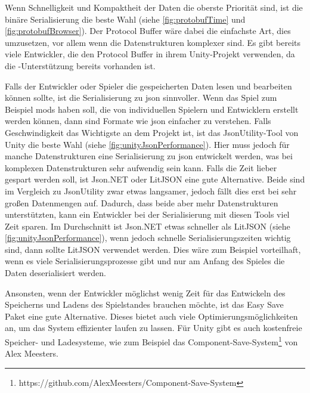 Wenn Schnelligkeit und Kompaktheit der Daten die oberste Priorität sind, ist die binäre Serialisierung die beste Wahl (siehe \ref{fig:protobufTime} und \ref{fig:protobufBrowser}). Der Protocol Buffer wäre dabei die einfachste Art, dies umzusetzen, vor allem wenn die Datenstrukturen komplexer sind. Es gibt bereits viele Entwickler, die den Protocol Buffer in ihrem Unity-Projekt verwenden, da die \csharp{}-Unterstützung bereits vorhanden ist. 

Falls der Entwickler oder Spieler die gespeicherten Daten lesen und bearbeiten können sollte, ist die Serialisierung zu \ac{json} sinnvoller. Wenn das Spiel zum Beispiel \acp{mod} haben soll, die von individuellen Spielern und Entwicklern erstellt werden können, dann sind Formate wie \ac{json} einfacher zu verstehen. Falls Geschwindigkeit das Wichtigste an dem Projekt ist, ist das JsonUtility-Tool von Unity die beste Wahl (siehe \ref{fig:unityJsonPerformance}). Hier muss jedoch für manche Datenstrukturen eine Serialisierung zu \ac{json} entwickelt werden, was bei komplexen Datenstrukturen sehr aufwendig sein kann. Falls die Zeit lieber gespart werden soll, ist Json.NET oder LitJSON eine gute Alternative. Beide sind im Vergleich zu JsonUtility zwar etwas langsamer, jedoch fällt dies erst bei sehr großen Datenmengen auf. Dadurch, dass beide aber mehr Datenstrukturen unterstützten, kann ein Entwickler bei der Serialisierung mit diesen Tools viel Zeit sparen. Im Durchschnitt ist Json.NET etwas schneller als LitJSON (siehe \ref{fig:unityJsonPerformance}), wenn jedoch schnelle Serialisierungszeiten wichtig sind, dann sollte LitJSON verwendet werden. Dies wäre zum Beispiel vorteilhaft, wenn es viele Serialisierungsprozesse gibt und nur am Anfang des Spieles die Daten deserialisiert werden.  

Ansonsten, wenn der Entwickler möglichst wenig Zeit für das Entwickeln des Speicherns und Ladens des Spielstandes brauchen möchte, ist das Easy Save Paket eine gute Alternative. Dieses bietet auch viele Optimierungsmöglichkeiten an, um das System effizienter laufen zu lassen. Für Unity gibt es auch kostenfreie Speicher- und Ladesysteme, wie zum Beispiel das Component-Save-System\footnote{https://github.com/AlexMeesters/Component-Save-System} von Alex Meesters. 



